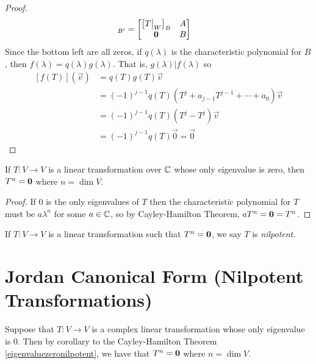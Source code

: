 \begin{proof}
  \begin{align}
    [T]_{B'} &= \bmatr{
      \left[T\big\rvert_{W}\right]_B & A \\
      {\bf 0} & B
    }
  \end{align}
  Since the bottom left are all zeros, if $q(\lambda)$ is the characteristic polynomial for $B$,
  then $f(\lambda) = q(\lambda)g(\lambda)$. That is, $g(\lambda) \vert f(\lambda)$ so
  \begin{align}
    \left[f(T)\right](\vec v) &= q(T)g(T)\vec v \\
      &= (-1)^{j-1}q(T)(T^j + a_{j-1}T^{j-1} + \cdots + a_0)\vec v \\
      &= (-1)^{j-1}q(T)(T^j - T^j)\vec v \\
      &= (-1)^{j-1}q(T)\vec 0 = \vec 0
  \end{align}
\end{proof}
\begin{corollary} \label{eigenvaluezeronilpotent}
  If $T : V \to V$ is a linear transformation over $\mathbb{C}$ whose only eigenvalue is zero,
  then $T^n = {\bf 0}$ where $n = \dim V$.
\end{corollary}
\begin{proof}
  If 0 is the only eigenvalues of $T$ then the characteristic polynomial for $T$ must be $a\lambda^n$
  for some $a \in \mathbb{C}$, so by Cayley-Hamilton Theorem, $aT^n = {\bf 0} = T^n$.
\end{proof}
\begin{definition}[Nilpotency]
  If $T : V \to V$ is a linear transformation such that $T^n = {\bf 0}$, we say $T$ is \emph{nilpotent}.
\end{definition}

\section{Jordan Canonical Form (Nilpotent Transformations)}

Suppose that $T : V \to V$ is a complex linear transformation whose only eigenvalue is 0.
Then by corollary to the Cayley-Hamilton Theorem \ref{eigenvaluezeronilpotent}, we have that $T^n = {\bf 0}$
where $n = \dim V$.


